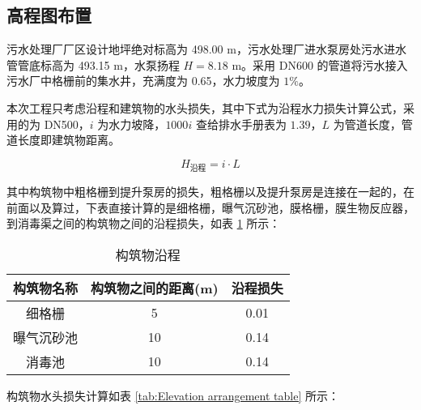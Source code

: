 \subsection{高程图布置}

污水处理厂厂区设计地坪绝对标高为 498.00 m，污水处理厂进水泵房处污水进水管管底标高为 493.15 m，水泵扬程 $H=8.18$ m。采用 DN600 的管道将污水接入污水厂中格栅前的集水井，充满度为 0.65，水力坡度为 $1\%$。

本次工程只考虑沿程和建筑物的水头损失，其中下式为沿程水力损失计算公式，采用的为 DN500，$i$ 为水力坡降，$1000i$ 查给排水手册表为 $1.39$，$L$ 为管道长度，管道长度即建筑物距离。

\begin{equation}
	H_{\text{沿程}} = i \cdot L
\end{equation}

其中构筑物中粗格栅到提升泵房的损失，粗格栅以及提升泵房是连接在一起的，在前面以及算过，下表直接计算的是细格栅，曝气沉砂池，膜格栅，膜生物反应器，到消毒渠之间的构筑物之间的沿程损失，如表 \ref{tab:Structures along the way} 所示：

\begin{table}[H]
	\centering
	\caption{构筑物沿程}
	\begin{tabular}{ccc}
	\toprule
	构筑物名称 & 构筑物之间的距离(m) & 沿程损失 \\
	\midrule
	细格栅   & 5     & 0.01 \\
	曝气沉砂池 & 10     & 0.14 \\
	消毒池   & 10    & 0.14 \\
	\bottomrule
	\end{tabular}
	\label{tab:Structures along the way}
\end{table}

构筑物水头损失计算如表 \ref{tab:Elevation arrangement table} 所示：

